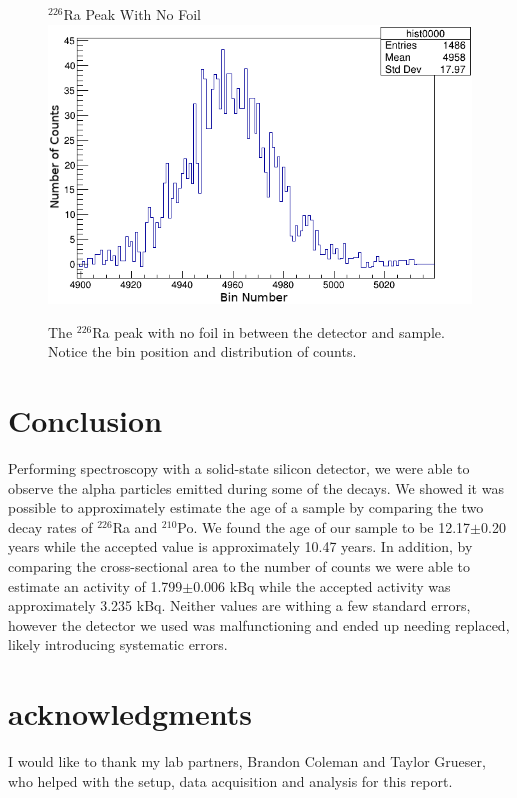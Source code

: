\documentclass[10pt]{IEEEtran}
\begin{document}
    \begin{figure}[!h]
        \begin{center}
        $^{226}$Ra Peak With No Foil
        \includegraphics[width=\columnwidth]{0000_4958.png}
       \caption{The $^{226}$Ra peak with no foil in between the detector and sample. Notice the bin position and distribution of counts.}
        \label{fig:0000_4958}
        \end{center}
    \end{figure}

\section{Conclusion}

Performing spectroscopy with a solid-state silicon detector, we were able to observe the alpha particles emitted during some of the decays. We showed it was possible to approximately estimate the age of a sample by comparing the two decay rates of $^{226}$Ra and $^{210}$Po. We found the age of our sample to be 12.17$\pm$0.20 years while the accepted value is approximately 10.47 years. In addition, by comparing the cross-sectional area to the number of counts we were able to estimate an activity of 1.799$\pm$0.006 kBq while the accepted activity was approximately 3.235 kBq. Neither values are withing a few standard errors, however the detector we used was malfunctioning and ended up needing replaced, likely introducing systematic errors.

\section{acknowledgments}
I would like to thank my lab partners, Brandon Coleman and Taylor Grueser, who helped with the setup, data acquisition and analysis for this report.
\printbibliography
\end{document}
